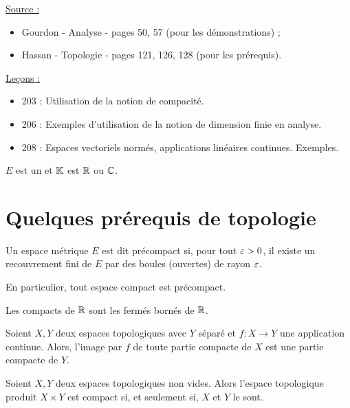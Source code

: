 

\pagestyle{fancy}

\fancyhead[C]{}
\fancyhead[R]{}



\underline{Source :} 
\begin{itemize}
\item Gourdon - Analyse - pages 50, 57 (pour les démonstrations) ;
\item Hassan - Topologie - pages 121, 126, 128 (pour les prérequis).
\end{itemize}

\underline{Leçons :}
\begin{itemize}
\item  203 : Utilisation de la notion de compacité.
\item  206 : Exemples d’utilisation de la notion de dimension finie en analyse.
\item  208 : Espaces vectoriels normés, applications linéaires continues. Exemples.
\end{itemize}

\begin{nota}
$E$ est un \Kev et $\mathbb{K}$ est $\mathbb{R}$ ou $\mathbb{C}$.
\end{nota}

\section{Quelques prérequis de topologie}

\begin{defn}[Précompacité]
Un espace métrique $E$ est dit précompact si, pour tout $\varepsilon>0$, il existe un recouvrement fini de $E$ par des boules (ouvertes)
de rayon $\varepsilon$.
\end{defn}

\begin{rmq}
En particulier, tout espace compact est précompact.
\end{rmq}

\begin{lem}
Les compacts de $\mathbb{R}$ sont les fermés bornés de $\mathbb{R}$.
\end{lem}

\begin{lem}
Soient $X, Y$ deux espaces topologiques avec $Y$ séparé et $f : X \to Y$ une application continue. 
Alors, l'image par $f$ de toute partie compacte de $X$ est une partie compacte de $Y$.
\end{lem}

\begin{lem}
Soient $X, Y$ deux espaces topologiques non vides. Alors l'espace topologique produit $X \times Y$ est compact si, 
et seulement si, $X$ et $Y$ le sont.
\end{lem}

